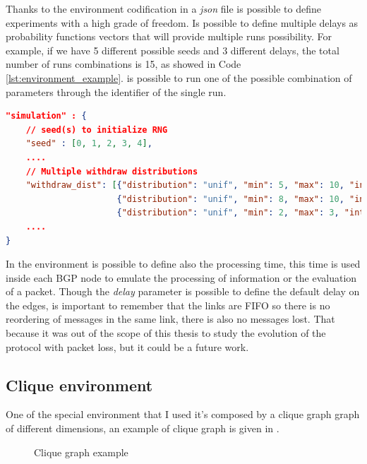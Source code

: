Thanks to the environment codification in a \textit{json} file is possible to
define experiments with a high grade of freedom.
Is possible to define multiple delays as probability functions vectors that
will provide multiple runs possibility. For example, if we have \num{5} different
possible seeds and \num{3} different delays, the total number of runs combinations
is \num{15}, as showed in Code \ref{lst:environment_example}.
is possible to run one of the possible combination of parameters through the identifier
of the single run.

\begin{lstlisting}[language=json, caption=Environment example, label=lst:environment_example]
"simulation" : {                                                              
    // seed(s) to initialize RNG                                      
    "seed" : [0, 1, 2, 3, 4], 
    ....
    // Multiple withdraw distributions
    "withdraw_dist": [{"distribution": "unif", "min": 5, "max": 10, "int": 0.1},
                      {"distribution": "unif", "min": 8, "max": 10, "int": 0.1},
                      {"distribution": "unif", "min": 2, "max": 3, "int": 0.1}],       
    ....
}
\end{lstlisting}

In the environment is possible to define also the processing time, this time is used
inside each \ac{BGP} node to emulate the processing of information or the evaluation
of a packet.
Though the \textit{delay} parameter is possible to define the default delay on the edges,
is important to remember that the links are FIFO so there is no reordering
of messages in the same link, there is also no messages lost.
That because it was out of the scope of this thesis to study the evolution
of the protocol with packet loss, but it could be a future work.

\subsection{Clique environment}
\label{subsec:clique_env}

One of the special environment that I used it's composed by a clique graph
graph of different dimensions, an example of clique graph is given in
.

\begin{figure}[h]                                                               
    \begin{center}                                                              
        
    \end{center}                                                                
    \caption{Clique graph example}                                
    \label{fig:clique_graph}
\end{figure}

